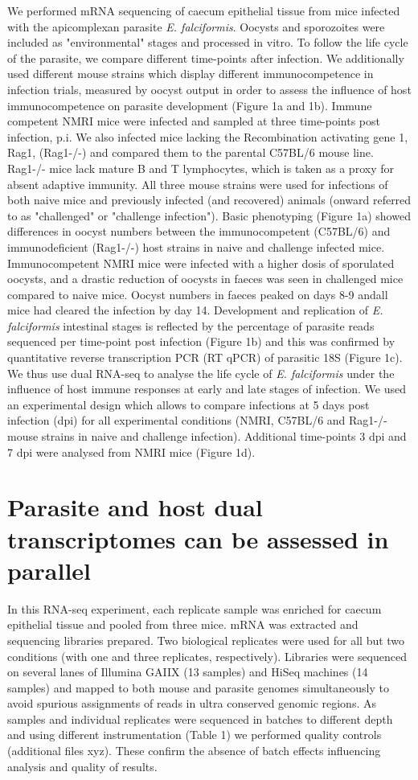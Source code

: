 \documentclass{bmcart}
\begin{document}
We performed mRNA sequencing of caecum epithelial tissue from mice infected with
the apicomplexan parasite \textit{E. falciformis}. Oocysts and
sporozoites were included as "environmental" stages and processed
in vitro. To follow the life cycle of the parasite, we
compare different time-points after infection. We additionally used different mouse strains which display different immunocompetence in infection trials, measured by oocyst output in order to assess the influence of host immunocompetence on parasite development (Figure 1a and 1b). Immune competent NMRI mice were infected and sampled at three time-points post infection, p.i. We also infected mice lacking the Recombination activating gene 1, Rag1, (Rag1-/-) and compared them to the parental C57BL/6 mouse line. Rag1-/- mice lack mature B and T lymphocytes, which is taken as a proxy for absent adaptive immunity. All three mouse strains were used for infections of both naive mice and previously infected (and recovered) animals (onward referred to as "challenged" or "challenge infection").
Basic phenotyping (Figure 1a) showed differences in oocyst numbers between the immunocompetent (C57BL/6) and immunodeficient (Rag1-/-) host strains in naive and challenge infected mice. Immunocompetent NMRI mice were infected with a higher dosis of sporulated oocysts, and a drastic reduction of oocysts in faeces was seen in challenged mice compared to naive mice. Oocyst numbers in faeces peaked on days 8-9 andall mice had cleared the infection by day 14. Development and replication of \textit{E. falciformis} intestinal stages is reflected by the percentage of parasite reads sequenced per time-point post infection (Figure 1b) and this was confirmed by quantitative reverse transcription PCR (RT qPCR) of parasitic 18S (Figure 1c).
We thus use dual RNA-seq to analyse the life cycle of \textit{E. falciformis} under
the influence of host immune responses at early and late stages of infection. We used an experimental
design which allows to compare infections at 5 days post infection (dpi) for all experimental
conditions (NMRI, C57BL/6 and Rag1-/- mouse strains in naive and challenge infection). Additional time-points 3 dpi and 7 dpi were analysed from NMRI mice (Figure 1d).

\section*{Parasite and host dual transcriptomes can be assessed in parallel}
In this RNA-seq experiment, each replicate sample was enriched for caecum epithelial tissue and pooled 
from three mice. mRNA was extracted and sequencing libraries prepared. Two biological replicates were used for all but two conditions (with one and three replicates, respectively). Libraries were sequenced on several lanes of Illumina GAIIX (13 samples) and HiSeq machines (14 samples) and mapped to both mouse and parasite genomes simultaneously to avoid spurious assignments of reads in ultra conserved genomic regions. As samples and individual replicates were sequenced in batches to different depth and using different instrumentation (Table 1) we performed quality controls (additional files xyz). These confirm the absence of batch effects influencing analysis and quality of results. 
\end{document}
